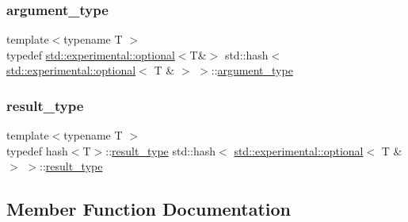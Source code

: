 \subsubsection{\texorpdfstring{argument\+\_\+type}{argument\_type}}
{\footnotesize\ttfamily template$<$typename T $>$ \\
typedef \mbox{\hyperlink{classstd_1_1experimental_1_1optional}{std\+::experimental\+::optional}}$<$T\&$>$ std\+::hash$<$ \mbox{\hyperlink{classstd_1_1experimental_1_1optional}{std\+::experimental\+::optional}}$<$ T \& $>$ $>$\+::\mbox{\hyperlink{structstd_1_1hash_3_01std_1_1experimental_1_1optional_3_01_t_01_6_01_4_01_4_ab5e4cdb491b0c3833fa266cdf95a26f8}{argument\+\_\+type}}}

\mbox{\label{structstd_1_1hash_3_01std_1_1experimental_1_1optional_3_01_t_01_6_01_4_01_4_acfb996ccc0604598b856ff0b73abf1a0}} 
\subsubsection{\texorpdfstring{result\+\_\+type}{result\_type}}
{\footnotesize\ttfamily template$<$typename T $>$ \\
typedef hash$<$T$>$\+::\mbox{\hyperlink{structstd_1_1hash_3_01std_1_1experimental_1_1optional_3_01_t_01_6_01_4_01_4_acfb996ccc0604598b856ff0b73abf1a0}{result\+\_\+type}} std\+::hash$<$ \mbox{\hyperlink{classstd_1_1experimental_1_1optional}{std\+::experimental\+::optional}}$<$ T \& $>$ $>$\+::\mbox{\hyperlink{structstd_1_1hash_3_01std_1_1experimental_1_1optional_3_01_t_01_6_01_4_01_4_acfb996ccc0604598b856ff0b73abf1a0}{result\+\_\+type}}}



\subsection{Member Function Documentation}
\mbox{\label{structstd_1_1hash_3_01std_1_1experimental_1_1optional_3_01_t_01_6_01_4_01_4_a7d500e8beb4c7420f49f73ffd68e0fac}} 
